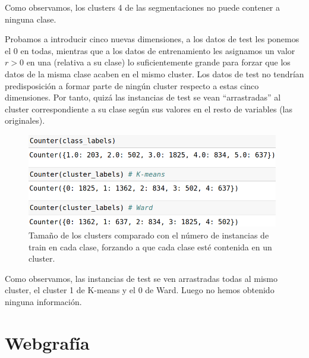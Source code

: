 \documentclass{article}
\begin{document}
Como observamos, los clusters 4 de las segmentaciones no puede
contener a ninguna clase.

Probamos a introducir cinco nuevas dimensiones, a los datos de test
les ponemos el 0 en todas, mientras que a los datos de entrenamiento
les asignamos un valor $r>0$ en una (relativa a su clase) lo
suficientemente grande para forzar que los datos de la misma clase
acaben en el mismo cluster. Los datos de test no tendrían
predisposición a formar parte de ningún cluster respecto a estas cinco
dimensiones. Por tanto, quizá las instancias de test se vean
``arrastradas'' al cluster correspondiente a su clase según sus
valores en el resto de variables (las originales). 

\begin{figure}[H]
  \centering 
  \includegraphics[width=110mm]{imgs/cluster2}
  \caption{Tamaño de los clusters comparado con el número de
    instancias de train en cada clase, forzando a que cada clase esté contenida en un cluster.}
  \label{fig:cluster2}
\end{figure} \vspace{-3mm}

Como observamos, las instancias de test se ven arrastradas todas al
mismo cluster, el cluster 1 de K-means y el 0 de Ward. Luego no hemos
obtenido ninguna información.

\section{Webgrafía}
\end{document}
